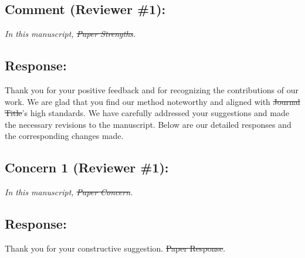 
{}
\subsection*{Comment (Reviewer \#1):}
\textit{In this manuscript, \sout{Paper Strengths}.}

\subsection*{Response:}
Thank you for your positive feedback and for recognizing the contributions of our work.
We are glad that you find our method noteworthy and aligned with \sout{Journal Title}'s high standards.
We have carefully addressed your suggestions and made the necessary revisions to the manuscript.
Below are our detailed responses and the corresponding changes made.

{}
\subsection*{Concern 1 (Reviewer \#1):}
\textit{In this manuscript, \sout{Paper Concern}.}

\subsection*{Response:}
Thank you for your constructive suggestion.
\sout{Paper Response}.

